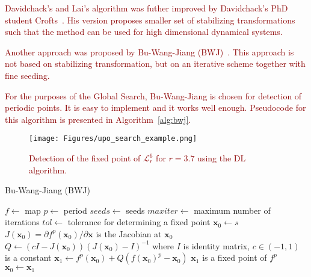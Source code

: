 \par
\textcolor{darkred}{
Davidchack's and Lai's algorithm was futher improved by Davidchack's PhD student Crofts~\cite{Crofts2005,Crofts2007,Crofts2008,Crofts20090901}.
His version proposes smaller set of stabilizing transformations such that the method can be used for high dimensional dynamical systems.
}
\par
\textcolor{darkred}{
Another approach was proposed by Bu-Wang-Jiang (BWJ)~\cite{Bu2004}.
This approach is not based on stabilizing transformation, but on an iterative scheme together with fine seeding.
}
\par
\textcolor{darkred}{
For the purposes of the Global Search, Bu-Wang-Jiang is chosen for detection of periodic points.
It is easy to implement and it works well enough.
Pseudocode for this algorithm is presented in Algorithm~\ref{alg:bwj}.
}

\begin{figure}[!h]
    \centering
    \texttt{[image: Figures/upo\_search\_example.png]}
    \caption{
        \textcolor{darkred}{
        Detection of the fixed point of $\mathcal{L}_{r}^{6}$ for $r = 3.7$ using the DL algorithm.
        }
    }
    \label{fig:upo_search_example}
\end{figure}

\begin{algorithm}[!h]
    \caption{Bu-Wang-Jiang (BWJ)}
    \label{alg:bwj}
    \begin{algorithmic}[1]
        \Statex $f \gets$ map
        \Statex $p \gets$ period
        \Statex $seeds \gets$ seeds
        \Statex $maxiter \gets$ maximum number of iterations
        \Statex $tol \gets$ tolerance for determining a fixed point
            \State $\textbf{x}_{0} \gets s$
                \State $J(\textbf{x}_{0}) = \partial f^{p}(\textbf{x}_{0}) / \partial \textbf{x}$ is the Jacobian at $\textbf{x}_{0}$
                \State $Q \gets (cI-J(\textbf{x}_{0}))(J(\textbf{x}_{0})-I)^{-1}$ where $I$ is identity matrix, $c \in (-1, 1)$ is a constant 
                \State $\textbf{x}_1 \gets f^{p}(\textbf{x}_{0}) + Q(f(\textbf{x}_{0})^{p}-\textbf{x}_{0})$
                    \State $\textbf{x}_{1}$ is a fixed point of $f^{p}$
                \EndIf
                \State $\textbf{x}_{0} \gets \textbf{x}_{1}$
            \EndWhile
        \EndFor
    \end{algorithmic}
\end{algorithm}

